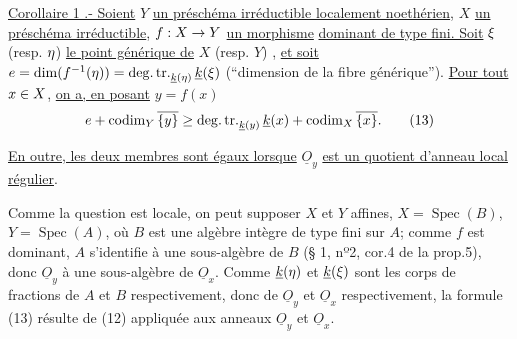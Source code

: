 \uline{Corollaire 1 .- Soient} $Y$ \uline{un préschéma irréductible localement noethérien}, $X$ \uline{un préschéma irréductible}, $f:X\to Y$ \uline{un morphisme}  \uline{dominant de type fini. Soit} $\xi$ (resp. $\eta$) \uline{le point générique de} $X$ (resp. $Y$) , \uline{et soit} $e=\dim(f^{-1}(\eta))=\operatorname{deg.tr.}_{\underline{k}(\eta)}\underline{k}(\xi)$ (``dimension de la fibre générique\unsure{/}''). \uline{Pour tout} $x\in X$, \uline{on a, en posant} $y=f(x)$
\[
 e+\operatorname{codim}_Y\overline{\{y\}}\geq
 \operatorname{deg.tr.}_{\underline{k}(y)}\underline{k}(x)
 +\operatorname{codim}_X\overline{\{x\}}.\tag*{(13)}
\]

\uline{En outre, les deux membres sont égaux lorsque} $\underline O_y$ \uline{est un quotient d'anneau local régulier}.

Comme la question est locale, on peut supposer $X$ et $Y$ affines,   $X=\operatorname{Spec}(B)$, $Y=\operatorname{Spec}(A)$, où $B$ est une algèbre intègre de type fini sur $A$; comme $f$ est dominant, $A$ s'identifie à une sous-algèbre de $B$ (§ 1, nº2, cor.4 de la prop.5), donc $\underline O_y$ à une sous-algèbre de $\underline O_x$. Comme $\underline k(\eta)$ et $\underline k(\xi)$ sont les corps de fractions de $A$ et $B$ respectivement, donc de  $\underline O_y$ et $\underline O_x$ respectivement, la formule (13) résulte de (12) appliquée aux anneaux $\underline O_y$ et $\underline O_x$.

